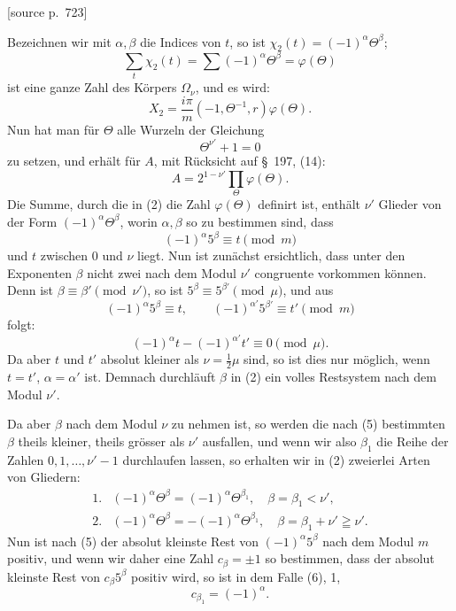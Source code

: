 \documentclass[11pt]{article}
\newcommand{\srcpage}[1]{\par\medskip\noindent\textsf{[source p.~#1]}\par\smallskip}
\begin{document}
\srcpage{723}
Bezeichnen wir mit $\alpha,\beta$ die Indices von $t$, so ist $\chi_2(t)=(-1)^\alpha\Theta^\beta$;
\begin{equation}
\sum_t\chi_2(t)=\sum(-1)^\alpha\Theta^\beta=\varphi(\Theta)
\tag{2}
\end{equation}
ist eine ganze Zahl des Körpers $\Omega_\nu$, und es wird:
\[
X_2=\frac{i\pi}{m}(-1,\Theta^{-1},r)\varphi(\Theta).
\]
Nun hat man für $\Theta$ alle Wurzeln der Gleichung
\begin{equation}
\Theta^{\nu'}+1=0
\tag{3}
\end{equation}
zu setzen, und erhält für $A$, mit Rücksicht auf \S~197, (14):
\begin{equation}
A=2^{1-\nu'}\prod_\Theta\varphi(\Theta).
\tag{4}
\end{equation}
Die Summe, durch die in (2) die Zahl $\varphi(\Theta)$ definirt ist, enthält $\nu'$ Glieder von der Form $(-1)^\alpha\Theta^\beta$, worin $\alpha,\beta$ so zu bestimmen sind, dass
\begin{equation}
(-1)^\alpha5^\beta\equiv t\pmod m
\tag{5}
\end{equation}
und $t$ zwischen 0 und $\nu$ liegt. Nun ist zunächst ersichtlich, dass unter den Exponenten $\beta$ nicht zwei nach dem Modul $\nu'$ congruente vorkommen können. Denn ist $\beta\equiv\beta'\pmod{\nu'}$, so ist $5^\beta\equiv5^{\beta'}\pmod\mu$, und aus
\[
(-1)^\alpha5^\beta\equiv t,
\qquad
(-1)^{\alpha'}5^{\beta'}\equiv t'\pmod m
\]
folgt:
\[
(-1)^\alpha t-(-1)^{\alpha'}t'\equiv0\pmod\mu.
\]
Da aber $t$ und $t'$ absolut kleiner als $\nu=\frac12\mu$ sind, so ist dies nur möglich, wenn $t=t'$, $\alpha=\alpha'$ ist. Demnach durchläuft $\beta$ in (2) ein volles Restsystem nach dem Modul $\nu'$.

Da aber $\beta$ nach dem Modul $\nu$ zu nehmen ist, so werden die nach (5) bestimmten $\beta$ theils kleiner, theils grösser als $\nu'$ ausfallen, und wenn wir also $\beta_1$ die Reihe der Zahlen $0,1,\ldots,\nu'-1$ durchlaufen lassen, so erhalten wir in (2) zweierlei Arten von Gliedern:
\begin{equation}
\begin{array}{ll}
1. & (-1)^\alpha\Theta^\beta=(-1)^\alpha\Theta^{\beta_1},\quad \beta=\beta_1<\nu',\\[1mm]
2. & (-1)^\alpha\Theta^\beta=-(-1)^\alpha\Theta^{\beta_1},\quad \beta=\beta_1+\nu'\geqq\nu'.
\end{array}
\tag{6}
\end{equation}
Nun ist nach (5) der absolut kleinste Rest von $(-1)^\alpha5^\beta$ nach dem Modul $m$ positiv, und wenn wir daher eine Zahl $c_\beta=\pm1$ so bestimmen, dass der absolut kleinste Rest von $c_\beta5^\beta$ positiv wird, so ist in dem Falle (6), 1,
\[
c_{\beta_1}=(-1)^\alpha.
\]
\end{document}
